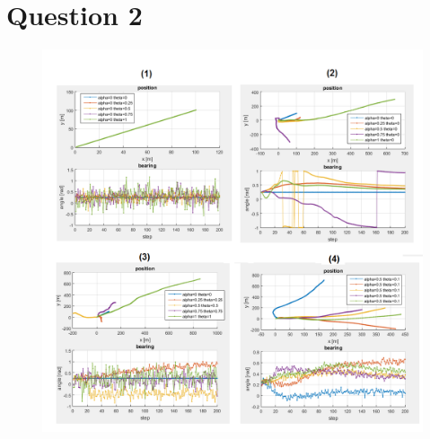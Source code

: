 \documentclass{article}
\begin{document}
\section*{Question 2}
\begin{figure}
   \caption{\label{q2} }
   \includegraphics[width=\textwidth,height=\textheight,keepaspectratio]{q2.png}
\end{figure}




\end{document}
